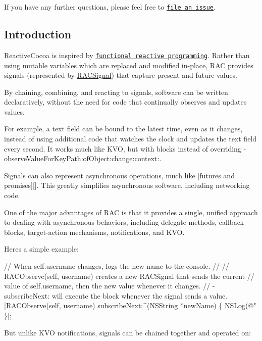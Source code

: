 If you have any further questions, please feel free to \href{https://github.com/ReactiveCocoa/ReactiveCocoa/issues/new}{\tt file an issue}.

\subsection*{Introduction}

Reactive\+Cocoa is inspired by \href{http://blog.maybeapps.com/post/42894317939/input-and-output}{\tt functional reactive programming}. Rather than using mutable variables which are replaced and modified in-\/place, R\+AC provides signals (represented by {\ttfamily \mbox{\hyperlink{interface_r_a_c_signal}{R\+A\+C\+Signal}}}) that capture present and future values.

By chaining, combining, and reacting to signals, software can be written declaratively, without the need for code that continually observes and updates values.

For example, a text field can be bound to the latest time, even as it changes, instead of using additional code that watches the clock and updates the text field every second. It works much like K\+VO, but with blocks instead of overriding {\ttfamily -\/observe\+Value\+For\+Key\+Path\+:of\+Object\+:change\+:context\+:}.

Signals can also represent asynchronous operations, much like \mbox{[}futures and promises\mbox{]}\mbox{[}\mbox{]}. This greatly simplifies asynchronous software, including networking code.

One of the major advantages of R\+AC is that it provides a single, unified approach to dealing with asynchronous behaviors, including delegate methods, callback blocks, target-\/action mechanisms, notifications, and K\+VO.

Here\textquotesingle{}s a simple example\+:


\begin{DoxyCode}
// When self.username changes, logs the new name to the console.
//
// RACObserve(self, username) creates a new RACSignal that sends the current
// value of self.username, then the new value whenever it changes.
// -subscribeNext: will execute the block whenever the signal sends a value.
[RACObserve(self, username) subscribeNext:^(NSString *newName) \{
    NSLog(@"%
\}];
\end{DoxyCode}


But unlike K\+VO notifications, signals can be chained together and operated on\+:


